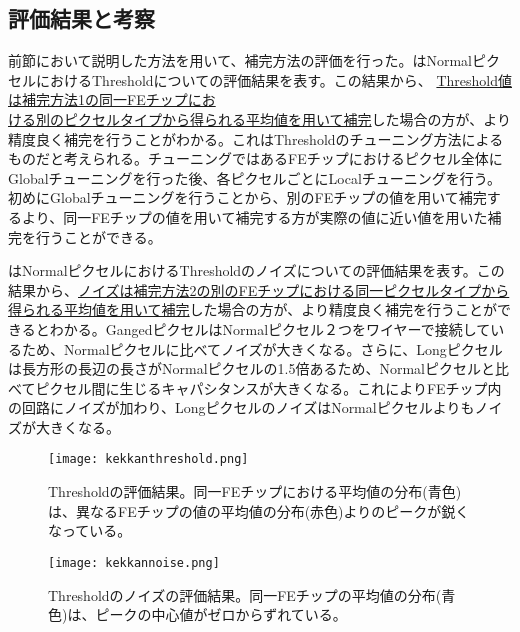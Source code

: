 \subsection{評価結果と考察}

前節において説明した方法を用いて、補完方法の評価を行った。はNormalピクセルにおけるThresholdについての評価結果を表す。この結果から、 \underline{Threshold値は補完方法1の同一FEチップにお}\\ \underline{ける別のピクセルタイプから得られる平均値を用いて補完}した場合の方が、より精度良く補完を行うことがわかる。これはThresholdのチューニング方法によるものだと考えられる。チューニングではあるFEチップにおけるピクセル全体にGlobalチューニングを行った後、各ピクセルごとにLocalチューニングを行う。初めにGlobalチューニングを行うことから、別のFEチップの値を用いて補完するより、同一FEチップの値を用いて補完する方が実際の値に近い値を用いた補完を行うことができる。

はNormalピクセルにおけるThresholdのノイズについての評価結果を表す。この結果から、\underline{ノイズは補完方法2の別のFEチップにおける同一ピクセルタイプから得られる平均値を用いて補完}した場合の方が、より精度良く補完を行うことができるとわかる。GangedピクセルはNormalピクセル２つをワイヤーで接続しているため、Normalピクセルに比べてノイズが大きくなる。さらに、Longピクセルは長方形の長辺の長さがNormalピクセルの1.5倍あるため、Normalピクセルと比べてピクセル間に生じるキャパシタンスが大きくなる。これによりFEチップ内の回路にノイズが加わり、LongピクセルのノイズはNormalピクセルよりもノイズが大きくなる。


\begin{figure}[tbp]
  \begin{minipage}[b]{0.5\linewidth}
    \centering
    \texttt{[image: kekkanthreshold.png]}
    \caption[Thresholdの評価結果]{Thresholdの評価結果。同一FEチップにおける平均値の分布(青色)は、異なるFEチップの値の平均値の分布(赤色)よりのピークが鋭くなっている。}
    \label{fig:kekkanthreshold}
  \end{minipage}
  \begin{minipage}[b]{0.5\linewidth}
    \centering
    \texttt{[image: kekkannoise.png]}
    \caption[Thresholdのノイズの評価結果]{Thresholdのノイズの評価結果。同一FEチップの平均値の分布(青色)は、ピークの中心値がゼロからずれている。\\}
    \label{fig:kekkannoise}
  \end{minipage}
\end{figure}

